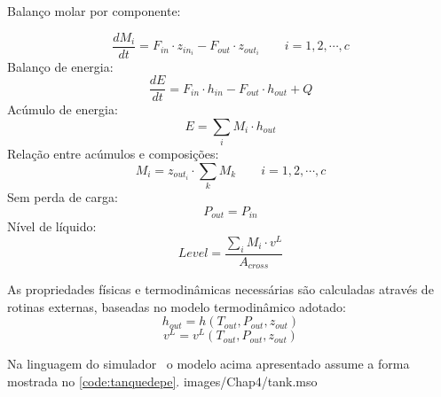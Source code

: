 \begin{flushleft}
Balanço molar por componente:
\end{flushleft}
\begin{equation}
\dfrac{dM_i}{dt} = F_{in} \cdot z_{in_i} - F_{out}  \cdot z_{out_i} \qquad i=1,2,\cdots,c
\end{equation}
Balanço de energia:
\begin{equation}
\dfrac{dE}{dt} = F_{in} \cdot h_{in} - F_{out}  \cdot h_{out} + Q
\end{equation}
Acúmulo de energia:
\begin{equation}
E = \sum_i M_i \cdot h_{out}
\end{equation}
Relação entre acúmulos e composições:
\begin{equation}
M_i = z_{out_i} \cdot \sum_k M_k \qquad i=1,2,\cdots,c
\end{equation}
Sem perda de carga:
\begin{equation}
P_{out} = P_{in}
\end{equation}
Nível de líquido:
\begin{equation}
Level = \dfrac{\sum_i M_i \cdot v^L}{A_{cross}}
\end{equation}

As propriedades físicas e termodinâmicas necessárias são calculadas através de rotinas externas,
baseadas no modelo termodinâmico adotado:
\begin{equation}
h_{out} = h(T_{out}, P_{out}, z_{out})
\end{equation}
\begin{equation}
v^L = v^L(T_{out}, P_{out}, z_{out})
\end{equation}

Na linguagem do simulador \emso\ o modelo acima apresentado assume a forma
mostrada no \autoref{code:tanquedepe}.
 {images/Chap4/tank.mso}

